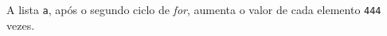 \documentclass[12pt,varwidth=16cm,border=1pt]{standalone}
\begin{document}
A lista \verb+a+, após o segundo ciclo de \textit{for}, aumenta o valor de cada elemento \verb+444+ vezes.

\questiomfalse
\end{document}
